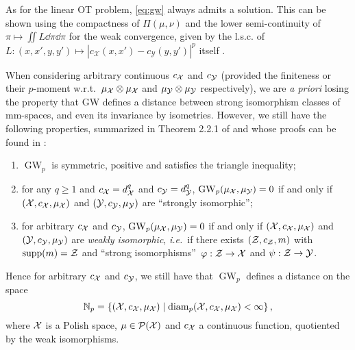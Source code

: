         As for the linear OT problem, \cref{eq:gw} always admits a solution. This can be shown using the compactness of $\Pi(\mu,\nu)$ and the lower semi-continuity of $\pi\mapsto\iint L\dd\pi\dd\pi$ for the weak convergence, given by the l.s.c. of $L:(x,x',y,y')\mapsto |c_{\mathcal{X}}(x,x')-c_{\mathcal{Y}}(y,y')|^p$ itself \cite{vayer2020contribution}.
        \begin{remark}
            \label{rem:arbitrary-costs}
            When considering arbitrary continuous $c_{\mathcal{X}}$ and $c_{\mathcal{Y}}$ (provided the finiteness or their $p$-moment w.r.t.~$\mu_{\mathcal{X}}\otimes\mu_{\mathcal{X}}$ and $\mu_{\mathcal{Y}}\otimes\mu_{\mathcal{Y}}$ respectively), we are \textit{a priori} losing the property that GW defines a distance between strong isomorphism classes of mm-spaces, and even its invariance by isometries. However, we still have the following properties, summarized in Theorem 2.2.1 of \cite{vayer2020contribution} and whose proofs can be found in \cite{sturm2012space,chowdhury2019gromov}:
            \begin{enumerate}[label=(\roman*)]
                \item $\operatorname{GW}_p$ is symmetric, positive and satisfies the triangle inequality;
                \item for any $q\geq 1$ and $c_{\mathcal{X}}=d_{\mathcal{X}}^q$ and $c_{\mathcal{Y}}=d_{\mathcal{Y}}^q$, $\operatorname{GW}_p(\mu_{\mathcal{X}},\mu_{\mathcal{Y}})=0$ if and only if $(\mathcal{X},c_{\mathcal{X}},\mu_{\mathcal{X}})$ and $(\mathcal{Y},c_{\mathcal{Y}},\mu_{\mathcal{Y}})$ are ``strongly isomorphic'';
                \item for arbitrary $c_{\mathcal{X}}$ and $c_{\mathcal{Y}}$, $\operatorname{GW}_p(\mu_{\mathcal{X}},\mu_{\mathcal{Y}})=0$ if and only if $(\mathcal{X},c_{\mathcal{X}},\mu_{\mathcal{X}})$ and $(\mathcal{Y},c_{\mathcal{Y}},\mu_{\mathcal{Y}})$ are \emph{weakly isomorphic}, \textit{i.e.}~if there exists $(\mathcal{Z},c_{\mathcal{Z}},m)$ with $\operatorname{supp}(m)=\mathcal{Z}$ and ``strong isomorphisms''\footnotemark\ $\varphi:\mathcal{Z}\to\mathcal{X}$ and $\psi:\mathcal{Z}\to\mathcal{Y}$.
            \end{enumerate}
            Hence for arbitrary $c_{\mathcal{X}}$ and $c_{\mathcal{Y}}$, we still have that $\operatorname{GW}_p$ defines a distance on the space $$\mathbb{N}_p=\{(\mathcal{X},c_{\mathcal{X}},\mu_{\mathcal{X}})\mid \operatorname{diam}_p(\mathcal{X},c_{\mathcal{X}},\mu_{\mathcal{X}})<\infty\}\,,$$ where $\mathcal{X}$ is a Polish space, $\mu\in\mathcal{P}(\mathcal{X})$ and $c_{\mathcal{X}}$ a continuous function, quotiented by the weak isomorphisms.
        \end{remark}



